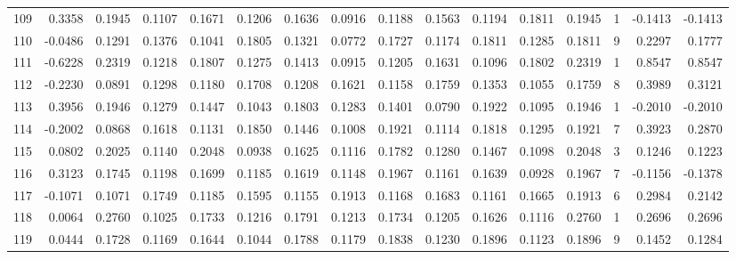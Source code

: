 \begin{tabular}{lrrrrrrrrrrrrrrr}
109 &      0.3358 &  0.1945 &  0.1107 &  0.1671 &  0.1206 &  0.1636 &  0.0916 &  0.1188 &  0.1563 &  0.1194 &   0.1811 &     0.1945 &      1 &                   -0.1413 &                    -0.1413 \\
110 &     -0.0486 &  0.1291 &  0.1376 &  0.1041 &  0.1805 &  0.1321 &  0.0772 &  0.1727 &  0.1174 &  0.1811 &   0.1285 &     0.1811 &      9 &                    0.2297 &                     0.1777 \\
111 &     -0.6228 &  0.2319 &  0.1218 &  0.1807 &  0.1275 &  0.1413 &  0.0915 &  0.1205 &  0.1631 &  0.1096 &   0.1802 &     0.2319 &      1 &                    0.8547 &                     0.8547 \\
112 &     -0.2230 &  0.0891 &  0.1298 &  0.1180 &  0.1708 &  0.1208 &  0.1621 &  0.1158 &  0.1759 &  0.1353 &   0.1055 &     0.1759 &      8 &                    0.3989 &                     0.3121 \\
113 &      0.3956 &  0.1946 &  0.1279 &  0.1447 &  0.1043 &  0.1803 &  0.1283 &  0.1401 &  0.0790 &  0.1922 &   0.1095 &     0.1946 &      1 &                   -0.2010 &                    -0.2010 \\
114 &     -0.2002 &  0.0868 &  0.1618 &  0.1131 &  0.1850 &  0.1446 &  0.1008 &  0.1921 &  0.1114 &  0.1818 &   0.1295 &     0.1921 &      7 &                    0.3923 &                     0.2870 \\
115 &      0.0802 &  0.2025 &  0.1140 &  0.2048 &  0.0938 &  0.1625 &  0.1116 &  0.1782 &  0.1280 &  0.1467 &   0.1098 &     0.2048 &      3 &                    0.1246 &                     0.1223 \\
116 &      0.3123 &  0.1745 &  0.1198 &  0.1699 &  0.1185 &  0.1619 &  0.1148 &  0.1967 &  0.1161 &  0.1639 &   0.0928 &     0.1967 &      7 &                   -0.1156 &                    -0.1378 \\
117 &     -0.1071 &  0.1071 &  0.1749 &  0.1185 &  0.1595 &  0.1155 &  0.1913 &  0.1168 &  0.1683 &  0.1161 &   0.1665 &     0.1913 &      6 &                    0.2984 &                     0.2142 \\
118 &      0.0064 &  0.2760 &  0.1025 &  0.1733 &  0.1216 &  0.1791 &  0.1213 &  0.1734 &  0.1205 &  0.1626 &   0.1116 &     0.2760 &      1 &                    0.2696 &                     0.2696 \\
119 &      0.0444 &  0.1728 &  0.1169 &  0.1644 &  0.1044 &  0.1788 &  0.1179 &  0.1838 &  0.1230 &  0.1896 &   0.1123 &     0.1896 &      9 &                    0.1452 &                     0.1284 \\

\end{tabular}
